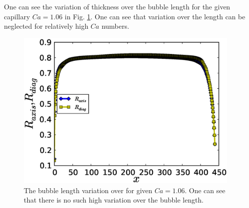 \documentclass{article}
\begin{document}
One can see the variation of thickness over the bubble length for the given capillary $Ca=1.06$ in
Fig. \ref{fig:variation:bubble:ca:one}. One can see that variation over the length can be neglected
for relatively high $Ca$ numbers.
\begin{figure}
\includegraphics[width=0.97\textwidth]{Figures/bubble_length_ca_one.eps}
\caption{The bubble length variation over for given $Ca=1.06$.
One can see that there is no such high variation over the bubble
length. \label{fig:variation:bubble:ca:one}}
\end{figure}
\end{document}
